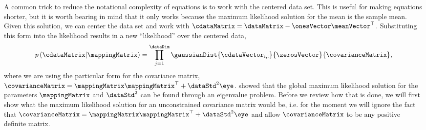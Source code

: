 A common trick to reduce the notational complexity of equations is to work with the centered data set. This is useful for making equations shorter, but it is worth bearing in mind that it only works because the maximum likelihood solution for the mean is the sample mean. Given this solution, we can center the
data set and work with $\cdataMatrix = \dataMatrix -
\onesVector\meanVector^\top$. Substituting this form into the likelihood results in a new ``likelihood'' over the centered data,
\[
p\left(\cdataMatrix|\mappingMatrix\right)=\prod_{j=1}^{\dataDim}\gaussianDist{\cdataVector_{i,:}}{\zerosVector}{\covarianceMatrix},
\]
where we are using the particular form for the covariance matrix, $
\covarianceMatrix=\mappingMatrix\mappingMatrix^{\top}+\dataStd^{2}\eye
$. \citet{Tipping:probpca99} showed that the global maximum likelihood
solution for the parameters $\mappingMatrix$ and $\dataStd^2$ can be
found through an eigenvalue problem. Before we review how that is
done, we will first show what the maximum likelihood solution for an
unconstrained covariance matrix would be, i.e. for the moment we will
ignore the fact that $
\covarianceMatrix=\mappingMatrix\mappingMatrix^{\top}+\dataStd^{2}\eye
$ and allow $\covarianceMatrix$ to be any positive definite matrix.


